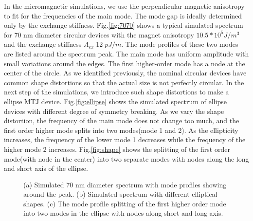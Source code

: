 In the micromagnetic simulations, we use the perpendicular magnetic anisotropy to fit for the frequencies of the main mode. The mode gap is ideally determined only by the exchange stiffness. Fig.\ref{fig:7070} shows a typical simulated spectrum for 70 nm diameter circular devices with the magnet anisotropy $10.5*10^5 J/m^3$ and the exchange stiffness $ A_{ex} \; 12 \; pJ/m $. The mode profiles of these two modes are listed around the spectrum peak. The main mode has uniform amplitude with small variations around the edges. The first higher-order mode has a node at the center of the circle. As we identified previously, the nominal circular devices have common shape distortions so that the actual size is not perfectly circular. In the next step of the simulations, we introduce such shape distortions to make a ellipse MTJ device. Fig.\ref{fig:ellipse} shows the simulated spectrum of ellipse devices with different degree of symmetry breaking. As we vary the shape distortion, the frequency of the main mode does not change too much, and the first order higher mode splits into two modes(mode 1 and 2). As the ellipticity increases, the frequency of the lower mode 1 decreases while the frequency of the higher mode 2 increases. Fig.\ref{fig:shape} shows the splitting of the first order mode(with node in the center) into two separate modes with nodes along the long and short axis of the ellipse.

\begin{figure}[!ht]
\centering
{}
\caption{(a) Simulated 70 nm diameter spectrum with mode profiles showing around the peak. (b) Simulated spectrum with different elliptical shapes. (c) The mode profile splitting of the first higher order mode into two modes in the ellipse with nodes along short and long axis.}
\end{figure}

